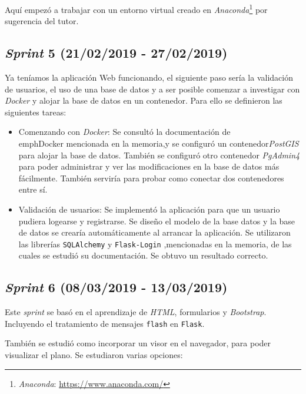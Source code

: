 Aquí empezó a trabajar con un entorno virtual creado en \emph{Anaconda}\footnote{\textsl{Anaconda}: \url{https://www.anaconda.com/}} por sugerencia del tutor.


\subsection{\emph{Sprint} 5 (21/02/2019 - 27/02/2019)}

Ya teníamos la aplicación Web funcionando, el siguiente paso sería la validación de usuarios, el uso de una base de datos y a ser posible comenzar a investigar con \emph{Docker} y alojar la base de datos en un contenedor. Para ello se definieron las siguientes tareas:

\begin{itemize}
\item Comenzando con \emph{Docker}: Se consultó la documentación de \\emph{Docker} mencionada en la memoria,y se configuró un contenedor\emph{PostGIS} para alojar la base de datos. También se configuró otro contenedor \emph{PgAdmin4} para poder administrar y ver las modificaciones en la base de datos más fácilmente. También serviría para probar como conectar dos contenedores entre sí.

\item Validación de usuarios: Se implementó la aplicación para que un usuario pudiera logearse y registrarse. Se diseño el modelo de la base datos y la base de datos se crearía automáticamente al arrancar la aplicación. Se utilizaron  las librerías \texttt{SQLAlchemy} y \texttt{Flask-Login} ,mencionadas en la memoria, de las cuales se estudió su documentación. Se obtuvo un resultado correcto.
\end{itemize} 


\subsection{\emph{Sprint} 6 (08/03/2019 - 13/03/2019)}

Este \emph{sprint} se basó en el aprendizaje de \emph{HTML}, formularios y \emph{Bootstrap}. Incluyendo el tratamiento de mensajes \texttt{flash} en \texttt{Flask}.

También se estudió como incorporar un visor en el navegador, para poder visualizar el plano. Se estudiaron varias opciones:

